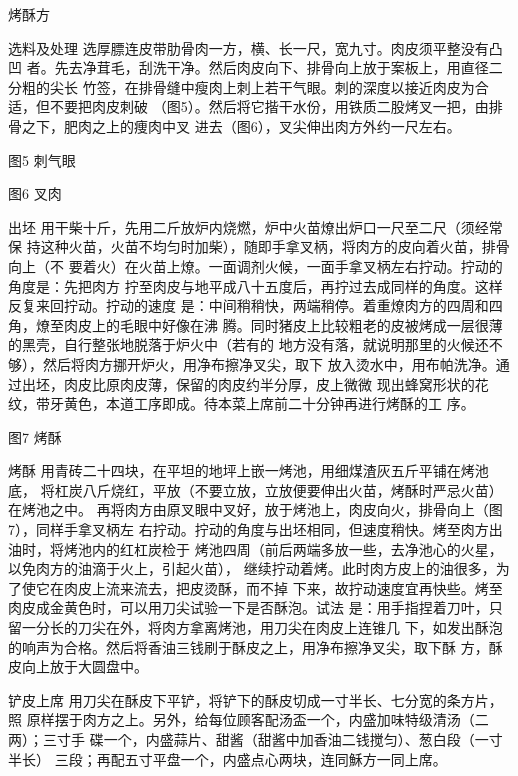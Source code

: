 \begin{recipe}{烤酥方}

\ingredients


\preparation

\step 选料及处理 选厚膘连皮带肋骨肉一方，横、长一尺，宽九寸。肉皮须平整没有凸凹
者。先去净茸毛，刮洗干净。然后肉皮向下、排骨向上放于案板上，用直径二分粗的尖长
竹签，在排骨缝中瘦肉上刺上若干气眼。刺的深度以接近肉皮为合适，但不要把肉皮刺破
（图5）。然后将它揩干水份，用铁质二股烤叉一把，由排骨之下，肥肉之上的痩肉中叉
进去（图6），叉尖伸出肉方外约一尺左右。

图5 刺气眼

图6 叉肉

\step 出坯 用干柴十斤，先用二斤放炉内烧燃，炉中火苗燎出炉口一尺至二尺（须经常保
持这种火苗，火苗不均匀时加柴），随即手拿叉柄，将肉方的皮向着火苗，排骨向上（不
要着火）在火苗上燎。一面调剂火候，一面手拿叉柄左右拧动。拧动的角度是：先把肉方
拧至肉皮与地平成八十五度后，再拧过去成同样的角度。这样反复来回拧动。拧动的速度
是：中间稍稍快，两端稍停。着重燎肉方的四周和四角，燎至肉皮上的毛眼中好像在沸
腾。同时猪皮上比较粗老的皮被烤成一层很薄的黑壳，自行整张地脱落于炉火中（若有的
地方没有落，就说明那里的火候还不够），然后将肉方挪开炉火，用净布擦净叉尖，取下
放入烫水中，用布帕洗净。通过出坯，肉皮比原肉皮薄，保留的肉皮约半分厚，皮上微微
现出蜂窝形状的花纹，带牙黄色，本道工序即成。待本菜上席前二十分钟再进行烤酥的工
序。

图7 烤酥

\step 烤酥 用青砖二十四块，在平坦的地坪上嵌一烤池，用细煤渣灰五斤平铺在烤池底，
将杠炭八斤烧红，平放（不要立放，立放便要伸出火苗，烤酥时严忌火苗）在烤池之中。
再将肉方由原叉眼中叉好，放于烤池上，肉皮向火，排骨向上（图7），同样手拿叉柄左
右拧动。拧动的角度与出坯相同，但速度稍快。烤至肉方出油时，将烤池内的红杠炭检于
烤池四周（前后两端多放一些，去净池心的火星，以免肉方的油滴于火上，引起火苗），
继续拧动着烤。此时肉方皮上的油很多，为了使它在肉皮上流来流去，把皮烫酥，而不掉
下来，故拧动速度宜再快些。烤至肉皮成金黄色时，可以用刀尖试验一下是否酥泡。试法
是：用手指捏着刀叶，只留一分长的刀尖在外，将肉方拿离烤池，用刀尖在肉皮上连锥几
下，如发出酥泡的响声为合格。然后将香油三钱刷于酥皮之上，用净布擦净叉尖，取下酥
方，酥皮向上放于大圆盘中。

\step 铲皮上席 用刀尖在酥皮下平铲，将铲下的酥皮切成一寸半长、七分宽的条方片，照
原样摆于肉方之上。另外，给每位顾客配汤盃一个，内盛加味特级清汤\footnotemark（二
两）；三寸手 碟一个，内盛蒜片、甜酱（甜酱中加香油二钱搅匀）、葱白段（一寸半长）
三段；再配五寸平盘一个，内盛点心两块，连同穌方一同上席。


\end{recipe}
